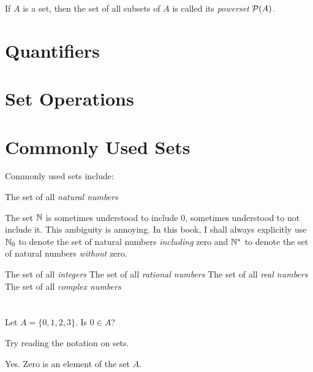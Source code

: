 If \(A\) is a set, then the set of all subsets of \(A\) is called its
\emph{powerset} \(\mathcal{P}(A)\).

\section{Quantifiers}

\section{Set Operations}

\section{Commonly Used Sets}
Commonly used sets include:
\begin{itemize}
   The set of all \emph{natural numbers}
\begin{remark}
  The set \(\mathbb{N}\) is sometimes understood to include \(0\), sometimes understood
  to not include it. This ambiguity is annoying.
  In this book, I shall always explicitly use \(\mathbb{N}_{0}\) to denote the set of
  natural numbers \emph{including} zero and \(\mathbb{N}^{*}\) to denote the set of
  natural numbers \emph{without} zero.
\end{remark}
   The set of all \emph{integers}
   The set of all \emph{rational numbers}
   The set of all \emph{real numbers}
   The set of all \emph{complex numbers}
\end{itemize}

\section{\problemhead}
\begin{problem}
  Let \(A=\{0,1,2,3\}\). Is \(0 \in A\)?
  \begin{hint}
    Try reading the notation on sets.
  \end{hint}
  \begin{sol}
    Yes. Zero is an element of the set \(A\).
  \end{sol}
\end{problem}
